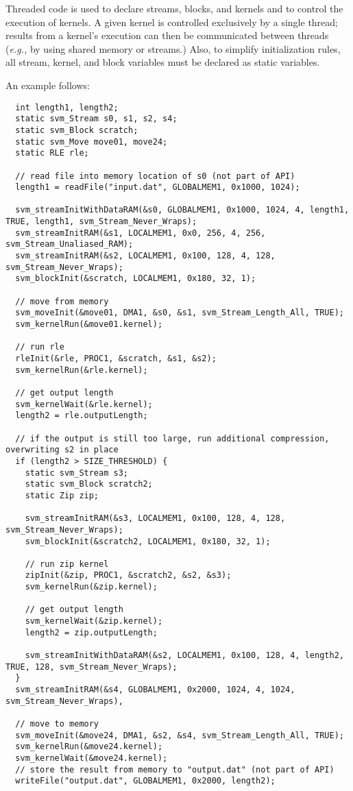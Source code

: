 Threaded code is used to declare streams, blocks, and kernels and to
control the execution of kernels.  A given kernel is controlled
exclusively by a single thread; results from a kernel's execution can
then be communicated between threads ({\it e.g.,} by using shared
memory or streams.)  Also, to simplify initialization rules, all
stream, kernel, and block variables must be declared as static
variables.

An example follows:

{\small
\begin{verbatim}
  int length1, length2;
  static svm_Stream s0, s1, s2, s4;
  static svm_Block scratch;
  static svm_Move move01, move24;
  static RLE rle;

  // read file into memory location of s0 (not part of API)
  length1 = readFile("input.dat", GLOBALMEM1, 0x1000, 1024);

  svm_streamInitWithDataRAM(&s0, GLOBALMEM1, 0x1000, 1024, 4, length1, TRUE, length1, svm_Stream_Never_Wraps);
  svm_streamInitRAM(&s1, LOCALMEM1, 0x0, 256, 4, 256, svm_Stream_Unaliased_RAM);
  svm_streamInitRAM(&s2, LOCALMEM1, 0x100, 128, 4, 128, svm_Stream_Never_Wraps);
  svm_blockInit(&scratch, LOCALMEM1, 0x180, 32, 1);

  // move from memory
  svm_moveInit(&move01, DMA1, &s0, &s1, svm_Stream_Length_All, TRUE);
  svm_kernelRun(&move01.kernel);
  
  // run rle
  rleInit(&rle, PROC1, &scratch, &s1, &s2);
  svm_kernelRun(&rle.kernel);

  // get output length
  svm_kernelWait(&rle.kernel);
  length2 = rle.outputLength;
  
  // if the output is still too large, run additional compression, overwriting s2 in place
  if (length2 > SIZE_THRESHOLD) {
    static svm_Stream s3;
    static svm_Block scratch2;
    static Zip zip;

    svm_streamInitRAM(&s3, LOCALMEM1, 0x100, 128, 4, 128, svm_Stream_Never_Wraps);
    svm_blockInit(&scratch2, LOCALMEM1, 0x180, 32, 1);

    // run zip kernel
    zipInit(&zip, PROC1, &scratch2, &s2, &s3);
    svm_kernelRun(&zip.kernel);
    
    // get output length
    svm_kernelWait(&zip.kernel);
    length2 = zip.outputLength;

    svm_streamInitWithDataRAM(&s2, LOCALMEM1, 0x100, 128, 4, length2, TRUE, 128, svm_Stream_Never_Wraps);
  }
  svm_streamInitRAM(&s4, GLOBALMEM1, 0x2000, 1024, 4, 1024, svm_Stream_Never_Wraps),
  
  // move to memory
  svm_moveInit(&move24, DMA1, &s2, &s4, svm_Stream_Length_All, TRUE);
  svm_kernelRun(&move24.kernel);
  svm_kernelWait(&move24.kernel);
  // store the result from memory to "output.dat" (not part of API)
  writeFile("output.dat", GLOBALMEM1, 0x2000, length2); 
\end{verbatim}}

